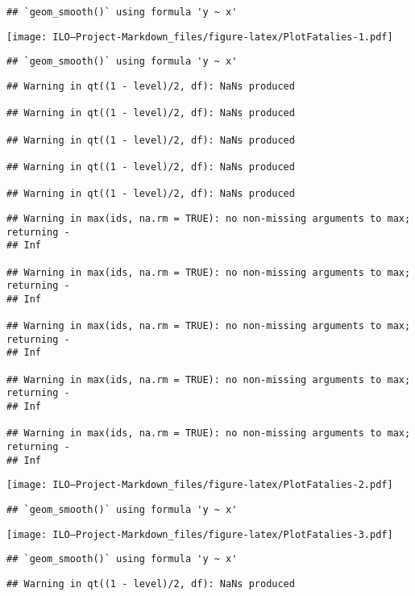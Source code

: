 \documentclass[
]{article}
\begin{document}
\begin{verbatim}
## `geom_smooth()` using formula 'y ~ x'
\end{verbatim}

\texttt{[image: ILO---Project-Markdown\_files/figure-latex/PlotFatalies-1.pdf]}

\begin{verbatim}
## `geom_smooth()` using formula 'y ~ x'
\end{verbatim}

\begin{verbatim}
## Warning in qt((1 - level)/2, df): NaNs produced

## Warning in qt((1 - level)/2, df): NaNs produced

## Warning in qt((1 - level)/2, df): NaNs produced

## Warning in qt((1 - level)/2, df): NaNs produced

## Warning in qt((1 - level)/2, df): NaNs produced
\end{verbatim}

\begin{verbatim}
## Warning in max(ids, na.rm = TRUE): no non-missing arguments to max; returning -
## Inf

## Warning in max(ids, na.rm = TRUE): no non-missing arguments to max; returning -
## Inf

## Warning in max(ids, na.rm = TRUE): no non-missing arguments to max; returning -
## Inf

## Warning in max(ids, na.rm = TRUE): no non-missing arguments to max; returning -
## Inf

## Warning in max(ids, na.rm = TRUE): no non-missing arguments to max; returning -
## Inf
\end{verbatim}

\texttt{[image: ILO---Project-Markdown\_files/figure-latex/PlotFatalies-2.pdf]}

\begin{verbatim}
## `geom_smooth()` using formula 'y ~ x'
\end{verbatim}

\texttt{[image: ILO---Project-Markdown\_files/figure-latex/PlotFatalies-3.pdf]}

\begin{verbatim}
## `geom_smooth()` using formula 'y ~ x'
\end{verbatim}

\begin{verbatim}
## Warning in qt((1 - level)/2, df): NaNs produced
\end{verbatim}
\end{document}
